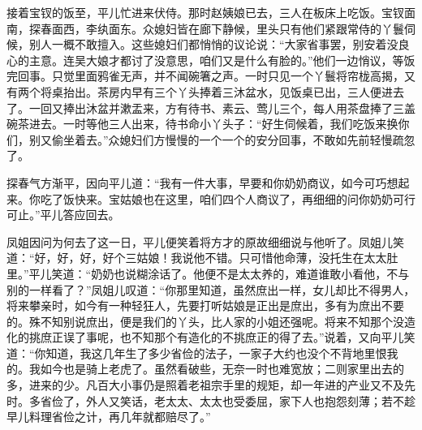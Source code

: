 接着宝钗的饭至，平儿忙进来伏侍。那时赵姨娘已去，三人在板床上吃饭。宝钗面南，探春面西，李纨面东。众媳妇皆在廊下静候，里头只有他们紧跟常侍的丫鬟伺候，别人一概不敢擅入。这些媳妇们都悄悄的议论说：“大家省事罢，别安着没良心的主意。连吴大娘才都讨了没意思，咱们又是什么有脸的。”他们一边悄议，等饭完回事。只觉里面鸦雀无声，并不闻碗箸之声。一时只见一个丫鬟将帘栊高揭，又有两个将桌抬出。茶房内早有三个丫头捧着三沐盆水，见饭桌已出，三人便进去了。一回又捧出沐盆并漱盂来，方有待书、素云、莺儿三个，每人用茶盘捧了三盖碗茶进去。一时等他三人出来，待书命小丫头子：“好生伺候着，我们吃饭来换你们，别又偷坐着去。”众媳妇们方慢慢的一个一个的安分回事，不敢如先前轻慢疏忽了。

探春气方渐平，因向平儿道：“我有一件大事，早要和你奶奶商议，如今可巧想起来。你吃了饭快来。宝姑娘也在这里，咱们四个人商议了，再细细的问你奶奶可行可止。”平儿答应回去。

凤姐因问为何去了这一日，平儿便笑着将方才的原故细细说与他听了。凤姐儿笑道：“好，好，好，好个三姑娘！我说他不错。只可惜他命薄，没托生在太太肚里。”平儿笑道：“奶奶也说糊涂话了。他便不是太太养的，难道谁敢小看他，不与别的一样看了？”凤姐儿叹道：“你那里知道，虽然庶出一样，女儿却比不得男人，将来攀亲时，如今有一种轻狂人，先要打听姑娘是正出是庶出，多有为庶出不要的。殊不知别说庶出，便是我们的丫头，比人家的小姐还强呢。将来不知那个没造化的挑庶正误了事呢，也不知那个有造化的不挑庶正的得了去。”说着，又向平儿笑道：“你知道，我这几年生了多少省俭的法子，一家子大约也没个不背地里恨我的。我如今也是骑上老虎了。虽然看破些，无奈一时也难宽放；二则家里出去的多，进来的少。凡百大小事仍是照着老祖宗手里的规矩，却一年进的产业又不及先时。多省俭了，外人又笑话，老太太、太太也受委屈，家下人也抱怨刻薄；若不趁早儿料理省俭之计，再几年就都赔尽了。”

